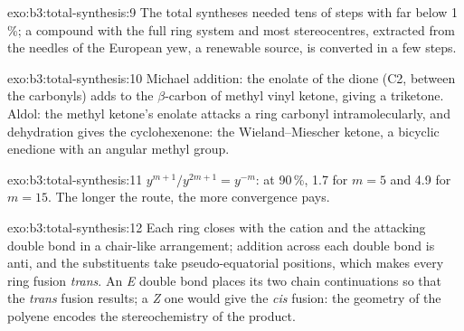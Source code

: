 \begin{solution}{exo:b3:total-synthesis:9}
The total syntheses needed tens of steps with  far below 1\,\%; a
compound with the full ring system and most stereocentres, extracted from the
needles of the European yew, a renewable source, is converted in a few steps.
\end{solution}

\begin{solution}{exo:b3:total-synthesis:10}
Michael addition: the enolate of the dione (C2, between the carbonyls) adds to the
$\beta$-carbon of methyl vinyl ketone, giving a triketone. Aldol: the methyl ketone's
enolate attacks a ring carbonyl intramolecularly, and dehydration gives the
cyclohexenone: the Wieland--Miescher ketone, a bicyclic enedione with an angular
methyl group.
\end{solution}

\begin{solution}{exo:b3:total-synthesis:11}
$y^{m+1}/y^{2m+1} = y^{-m}$: at 90\,\%, 1.7 for $m = 5$ and 4.9 for $m = 15$. The longer the route, the more
convergence pays.
\end{solution}

\begin{solution}{exo:b3:total-synthesis:12}
Each ring closes with the cation and the attacking double bond in a chair-like
arrangement; addition across each double bond is anti, and the substituents take
pseudo-equatorial positions, which makes every ring fusion \textit{trans}. An \textit{E} double bond
places its two chain continuations so that the \textit{trans} fusion results; a \textit{Z} one would
give the \textit{cis} fusion: the geometry of the polyene encodes the stereochemistry of
the product.
\end{solution}

